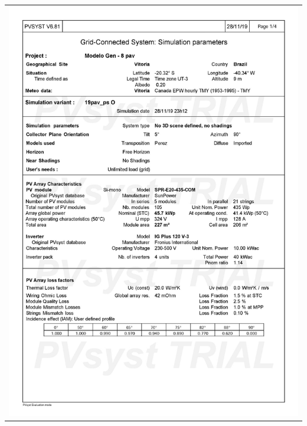 \begin{table}[H]
    \centering
    \begin{tabular}{l}
        \includegraphics[width=\textwidth]{figures/attachments/resultpv33.jpg}
    \end{tabular}
\end{table}
\pagebreak
